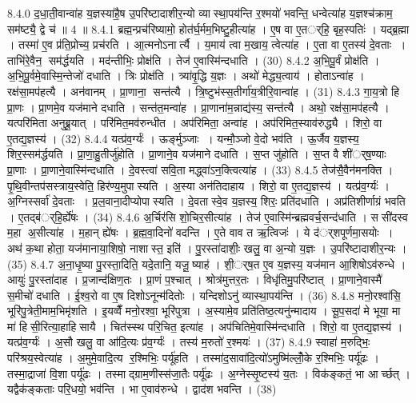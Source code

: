 8.4.0
द॒धा॒ती॒वान्वा॑ह य॒ज्ञस्या॑है॒ष उ॒परि॑ष्टादाशीर॒न्यो व्यास्था॒पय॑न्ति र॒श्मयो॑ भवन्ति॒ धन्वेत्या॑ह य॒ज्ञश्च॑क्राम॒ सम॑ष्ट्यै॒ द्वे च॑ ॥ 4 ॥
8.4.1
ब्रह्म॒न्प्रच॑रिष्यामो॒ होत॑र्घ॒र्मम॒भिष्टु॒हीत्या॑ह । ए॒ष वा ए॒तर््हि॒ बृह॒स्पतिः॑ । यद्ब्र॒ह्मा । तस्मा॑ ए॒व प्र॑ति॒प्रोच्य॒ प्रच॑रति । आ॒त्मनोऽनार्त्यै । य॒माय॑ त्वा म॒खाय॒ त्वेत्या॑ह । ए॒ता वा ए॒तस्य॑ दे॒वताः । ताभि॑रे॒वैन॒ सम॑र्द्धयति । मद॑न्तीभिः॒ प्रोक्ष॑ति । तेज॑ ए॒वास्मि॑न्दधाति । (30)
8.4.2
अ॒भि॒पू॒र्वं प्रोक्ष॑ति । अ॒भि॒पू॒र्वमे॒वास्मि॒न्तेजो॑ दधाति । त्रिः प्रोक्ष॑ति । त्र्या॑वृ॒द्धि य॒ज्ञः । अथो॑ मेद्ध्य॒त्वाय॑ । होताऽन्वा॑ह । रक्ष॑सा॒मप॑हत्यै । अन॑वानम् । प्रा॒णाना॒ सन्त॑त्यै । त्रि॒ष्टुभ॑स्स॒तीर्गा॑य॒त्रीरि॒वान्वा॑ह । (31)
8.4.3
गा॒य॒त्रो हि प्रा॒णः । प्रा॒णमे॒व यज॑माने दधाति । सन्त॑त॒मन्वा॑ह । प्रा॒णाना॑म॒न्नाद्य॑स्य॒ सन्त॑त्यै । अथो॒ रक्ष॑सा॒मप॑हत्यै । यत्परि॑मिता अनुब्रू॒यात् । परि॑मित॒मव॑रुन्धीत । अप॑रिमिता॒ अन्वा॑ह । अप॑रिमित॒स्याव॑रुद्ध्यै । शिरो॒ वा ए॒तद्य॒ज्ञस्य॑ । (32)
8.4.4
यत्प्र॑व॒र्ग्यः॑ । ऊर्ङ्मुञ्जाः । यन्मौ॒ञ्जो वे॒दो भव॑ति । ऊ॒र्जैव य॒ज्ञस्य॒ शिर॒स्सम॑र्द्धयति । प्रा॒णा॒हु॒तीर्जु॑होति । प्रा॒णाने॒व यज॑माने दधाति । स॒प्त जु॑होति । स॒प्त वै शी॑र््ष॒ण्याः प्रा॒णाः । प्रा॒णाने॒वास्मि॑न्दधाति । दे॒वस्त्वा॑ सवि॒ता मद्ध्वा॑ऽन॒क्त्वित्या॑ह । (33)
8.4.5
तेज॑सै॒वैन॑मनक्ति । पृ॒थि॒वीन्तप॑सस्त्राय॒स्वेति॒ हिर॑ण्य॒मुपास्यति । अ॒स्या अन॑तिदाहाय । शिरो॒ वा ए॒तद्य॒ज्ञस्य॑ । यत्प्र॑व॒र्ग्यः॑ । अ॒ग्निस्सर्वा॑ दे॒वताः । प्र॒ल॒वाना॒दीप्योपास्यति । दे॒वतास्वे॒व य॒ज्ञस्य॒ शिरः॒ प्रति॑दधाति । अप्र॑तिशीर्णाग्रं भवति । ए॒तद्ब॑र््हि॒र्\mbox{}ह्ये॑षः । (34)
8.4.6
अ॒र्चिर॑सि शो॒चिर॒सीत्या॑ह । तेज॑ ए॒वास्मि॑न्ब्रह्मवर्च॒सन्द॑धाति । ससी॑दस्व म॒हा अ॒सीत्या॑ह । म॒हान् ह्ये॑षः । ब्र॒ह्म॒वा॒दिनो॑ वदन्ति । ए॒ते वाव त ऋ॒त्विजः॑ । ये द॑र््शपूर्णमा॒सयोः । अथ॑ क॒था होता॒ यज॑मानाया॒शिषो॒ नाशास्त॒ इति॑ । पु॒रस्ता॑दाशीः॒ खलु॒ वा अ॒न्यो य॒ज्ञः । उ॒परि॑ष्टादाशीर॒न्यः । (35)
8.4.7
अ॒ना॒धृ॒ष्या पु॒रस्ता॒दिति॒ यदे॒तानि॒ यजू॒ष्याह॑ । शी॒र््ष॒त ए॒व य॒ज्ञस्य॒ यज॑मान आ॒शिषोऽव॑रुन्धे । आयुः॑ पु॒रस्ता॑दाह । प्र॒जान्द॑क्षिण॒तः । प्रा॒णं प॒श्चात् । श्रोत्र॑मुत्तर॒तः । विधृ॑तिमु॒परि॑ष्टात् । प्रा॒णाने॒वास्मै॑ स॒मीचो॑ दधाति । ई॒श्व॒रो वा ए॒ष दिशोऽनून्म॑दितोः । यन्दिशोऽनु॑ व्यास्था॒पय॑न्ति । (36)
8.4.8
मनो॒रश्वा॑सि॒ भूरि॑पु॒त्रेती॒माम॒भिमृ॑शति । इ॒यव्वैँ मनो॒रश्वा॒ भूरि॑पुत्रा । अ॒स्यामे॒व प्रति॑तिष्ठ॒त्यनु॑न्मादाय । सू॒प॒सदा॑ मे भूया॒ मा मा॑ हिसी॒रित्या॒हाहिसायै । चित॑स्स्थ परि॒चित॒ इत्या॑ह । अप॑चितिमे॒वास्मि॑न्दधाति । शिरो॒ वा ए॒तद्य॒ज्ञस्य॑ । यत्प्र॑व॒र्ग्यः॑ । अ॒सौ खलु॒ वा आ॑दि॒त्यः प्र॑व॒र्ग्यः॑ । तस्य॑ म॒रुतो॑ र॒श्मयः॑ । (37)
8.4.9
स्वाहा॑ म॒रुद्भिः॒ परि॑श्रय॒स्वेत्या॑ह । अ॒मुमे॒वादि॒त्य र॒श्मिभिः॒ पर्यू॑हति । तस्मा॑द॒सावा॑दि॒त्यो॑ऽमुष्मि॑ल्लोँ॒के र॒श्मिभिः॒ पर्यू॑ढः । तस्मा॒द्राजा॑ वि॒शा पर्यू॑ढः । तस्माद्ग्राम॒णीस्स॑जा॒तैः पर्यू॑ढः । अ॒ग्नेस्सृ॒ष्टस्य॑ य॒तः । विक॑ङ्कतं॒ भा आर्च्छत् । यद्वैक॑ङ्कताः परि॒धयो॒ भव॑न्ति । भा ए॒वाव॑रुन्धे । द्वाद॑श भवन्ति । (38)
